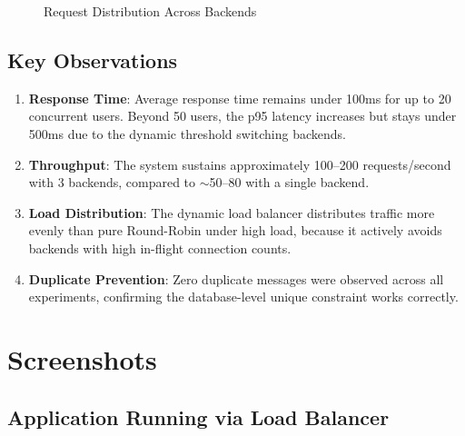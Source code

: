 \documentclass[12pt, a4paper]{article}
\begin{document}
\begin{figure}[H]
\centering
{}
\caption{Request Distribution Across Backends}
\label{fig:distribution}
\end{figure}

\subsection{Key Observations}

\begin{enumerate}
    \item \textbf{Response Time}: Average response time remains under 100ms for up to 20 concurrent users. Beyond 50 users, the p95 latency increases but stays under 500ms due to the dynamic threshold switching backends.
    \item \textbf{Throughput}: The system sustains approximately 100--200 requests/second with 3 backends, compared to $\sim$50--80 with a single backend.
    \item \textbf{Load Distribution}: The dynamic load balancer distributes traffic more evenly than pure Round-Robin under high load, because it actively avoids backends with high in-flight connection counts.
    \item \textbf{Duplicate Prevention}: Zero duplicate messages were observed across all experiments, confirming the database-level unique constraint works correctly.
\end{enumerate}


\section{Screenshots}

\subsection{Application Running via Load Balancer}
\end{document}
